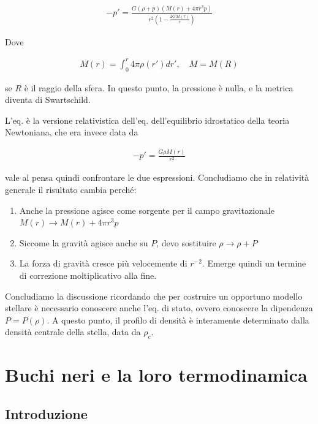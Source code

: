 \documentclass{report}
\begin{document}
\begin{align}
    -p' = \frac{G(\rho+p)(M(r) + 4\pi r^3p)}{r^2 \left(1-\frac{2GM(r)}{r}\right)}
\end{align}

Dove 

\begin{align}
    M(r) = \int_0^r 4\pi \rho(r')dr', \quad M = M(R)
\end{align}

se \(R\) è il raggio della sfera. In questo punto, la pressione è nulla, e la metrica diventa di Swartschild. 

L'eq. è la versione relativistica dell'eq. dell'equilibrio idrostatico della teoria Newtoniana, che era invece data da 

\begin{align}
    -p' = \frac{G\rho M(r)}{r^2}
\end{align}

vale al pensa quindi confrontare le due espressioni. Concludiamo che in relatività generale il risultato cambia perché: 

\begin{enumerate}
    \item Anche la pressione agisce come sorgente per il campo gravitazionale \(M(r) \rightarrow M(r) + 4\pi r^3p\)
    \item Siccome la gravità agisce anche su \(P\), devo sostituire \(\rho \rightarrow \rho + P\)
    \item La forza di gravità cresce più velocemente di \(r^{-2}\). Emerge quindi un termine di correzione moltiplicativo alla fine. 
\end{enumerate}


Concludiamo la discussione ricordando che per costruire un opportuno modello stellare è necessario conoscere anche l'eq. di stato, ovvero conoscere la dipendenza \(P = P (\rho)\). A questo punto, il profilo di densità è interamente determinato dalla densità centrale della stella, data da \(\rho_c\). 





\chapter{Buchi neri e la loro termodinamica}

\section{Introduzione}
\end{document}
